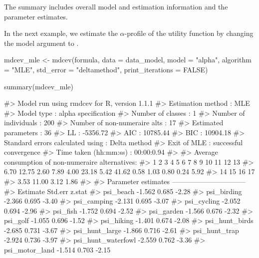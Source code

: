 The summary includes overall model and estimation information and the
parameter estimates.

In the next example, we estimate the \(\alpha\)-profile of the utility
function by changing the model argument to .

\begin{Schunk}
\begin{Sinput}
mdcev_mle <- mdcev(formula,
                    data = data_model,
                    model = "alpha",
                    algorithm = "MLE",
                    std_error = "deltamethod",
                    print_iterations = FALSE)
\end{Sinput}
\end{Schunk}

\begin{Schunk}
\begin{Sinput}
summary(mdcev_mle)
\end{Sinput}
\begin{Soutput}
#> Model run using rmdcev for R, version 1.1.1 
#> Estimation method                : MLE
#> Model type                       : alpha specification
#> Number of classes                : 1
#> Number of individuals            : 200
#> Number of non-numeraire alts     : 17
#> Estimated parameters             : 36
#> LL                               : -5356.72
#> AIC                              : 10785.44
#> BIC                              : 10904.18
#> Standard errors calculated using : Delta method
#> Exit of MLE                      : successful convergence
#> Time taken (hh:mm:ss)            : 00:00:0.94
#> 
#> Average consumption of non-numeraire alternatives:
#>     1     2     3     4     5     6     7     8     9    10    11    12    13 
#>  6.70 12.75  2.60  7.89  4.00 23.18  5.42 41.62  0.58  1.03  0.80  0.24  5.92 
#>    14    15    16    17 
#>  3.53 11.00  3.12  1.86 
#> 
#> Parameter estimates --------------------------------  
#>                    Estimate Std.err z.stat
#> psi_beach            -1.562   0.685  -2.28
#> psi_birding          -2.366   0.695  -3.40
#> psi_camping          -2.131   0.695  -3.07
#> psi_cycling          -2.052   0.694  -2.96
#> psi_fish             -1.752   0.694  -2.52
#> psi_garden           -1.566   0.676  -2.32
#> psi_golf             -1.055   0.696  -1.52
#> psi_hiking           -1.401   0.674  -2.08
#> psi_hunt_birds       -2.685   0.731  -3.67
#> psi_hunt_large       -1.866   0.716  -2.61
#> psi_hunt_trap        -2.924   0.736  -3.97
#> psi_hunt_waterfowl   -2.559   0.762  -3.36
#> psi_motor_land       -1.514   0.703  -2.15

\end{Soutput}
\end{Schunk}
